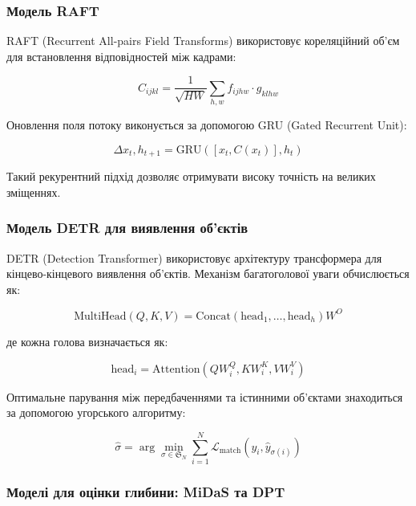 \documentclass[14pt, a4paper]{extarticle}
\numberwithin{equation}{section}
\begin{document}
\subsubsection{Модель RAFT}

RAFT (Recurrent All-pairs Field Transforms) \cite{teed2020raft} використовує кореляційний об'єм для встановлення відповідностей між кадрами:

\begin{equation}
C_{ijkl} = \frac{1}{\sqrt{HW}} \sum_{h,w} f_{ijhw} \cdot g_{klhw} \tag{19}
\end{equation}

Оновлення поля потоку виконується за допомогою GRU (Gated Recurrent Unit):

\begin{equation}
\Delta x_t, h_{t+1} = \text{GRU}([x_t, C(x_t)], h_t) \tag{21}
\end{equation}

Такий рекурентний підхід дозволяє отримувати високу точність на великих зміщеннях.

\subsubsection{Модель DETR для виявлення об'єктів}

DETR (Detection Transformer) \cite{carion2020end} використовує архітектуру трансформера для кінцево-кінцевого виявлення об'єктів. Механізм багатоголової уваги обчислюється як:

\begin{equation}
\text{MultiHead}(Q, K, V) = \text{Concat}(\text{head}_1, \ldots, \text{head}_h) W^O \tag{58}
\end{equation}

де кожна голова визначається як:

\begin{equation}
\text{head}_i = \text{Attention}(QW_i^Q, KW_i^K, VW_i^V) \tag{59}
\end{equation}

Оптимальне парування між передбаченнями та істинними об'єктами знаходиться за допомогою угорського алгоритму:

\begin{equation}
\hat{\sigma} = \arg\min_{\sigma \in \mathfrak{S}_N} \sum_{i=1}^N \mathcal{L}_{\text{match}}(y_i, \hat{y}_{\sigma(i)}) \tag{60}
\end{equation}

\subsubsection{Моделі для оцінки глибини: MiDaS та DPT}
\end{document}

